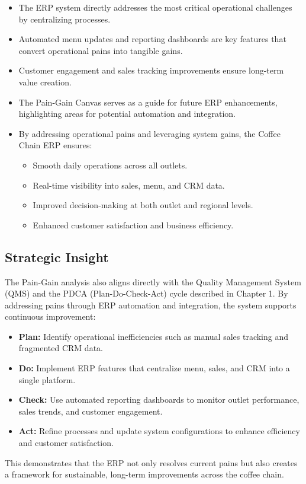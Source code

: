 \begin{itemize}
    \item The ERP system directly addresses the most critical operational challenges by centralizing processes.
    \item Automated menu updates and reporting dashboards are key features that convert operational pains into tangible gains.
    \item Customer engagement and sales tracking improvements ensure long-term value creation.
    \item The Pain-Gain Canvas serves as a guide for future ERP enhancements, highlighting areas for potential automation and integration.
    \item By addressing operational pains and leveraging system gains, the Coffee Chain ERP ensures:
    \begin{itemize}
        \item Smooth daily operations across all outlets.
        \item Real-time visibility into sales, menu, and CRM data.
        \item Improved decision-making at both outlet and regional levels.
        \item Enhanced customer satisfaction and business efficiency.
    \end{itemize}
\end{itemize}

\subsection*{Strategic Insight}

The Pain-Gain analysis also aligns directly with the Quality Management System (QMS) and the PDCA (Plan-Do-Check-Act) cycle described in Chapter 1.  
By addressing pains through ERP automation and integration, the system supports continuous improvement:

\begin{itemize}
    \item \textbf{Plan:} Identify operational inefficiencies such as manual sales tracking and fragmented CRM data.
    \item \textbf{Do:} Implement ERP features that centralize menu, sales, and CRM into a single platform.
    \item \textbf{Check:} Use automated reporting dashboards to monitor outlet performance, sales trends, and customer engagement.
    \item \textbf{Act:} Refine processes and update system configurations to enhance efficiency and customer satisfaction.
\end{itemize}

This demonstrates that the ERP not only resolves current pains but also creates a framework for sustainable, long-term improvements across the coffee chain.
